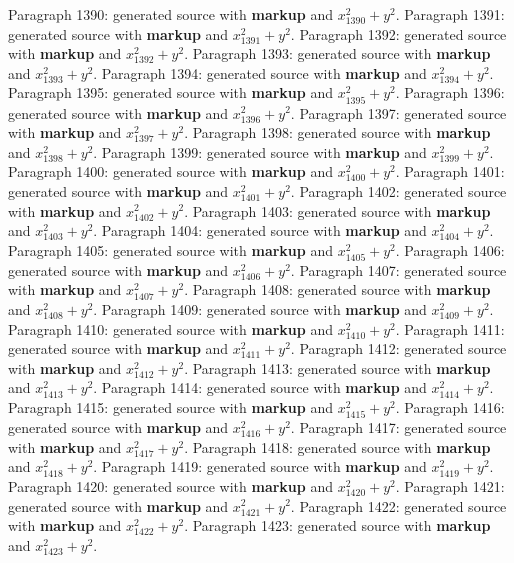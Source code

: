 \documentclass{article}
\begin{document}
Paragraph 1390: generated source with \textbf{markup} and $x_{1390}^2 + y^2$.
Paragraph 1391: generated source with \textbf{markup} and $x_{1391}^2 + y^2$.
Paragraph 1392: generated source with \textbf{markup} and $x_{1392}^2 + y^2$.
Paragraph 1393: generated source with \textbf{markup} and $x_{1393}^2 + y^2$.
Paragraph 1394: generated source with \textbf{markup} and $x_{1394}^2 + y^2$.
Paragraph 1395: generated source with \textbf{markup} and $x_{1395}^2 + y^2$.
Paragraph 1396: generated source with \textbf{markup} and $x_{1396}^2 + y^2$.
Paragraph 1397: generated source with \textbf{markup} and $x_{1397}^2 + y^2$.
Paragraph 1398: generated source with \textbf{markup} and $x_{1398}^2 + y^2$.
Paragraph 1399: generated source with \textbf{markup} and $x_{1399}^2 + y^2$.
Paragraph 1400: generated source with \textbf{markup} and $x_{1400}^2 + y^2$.
Paragraph 1401: generated source with \textbf{markup} and $x_{1401}^2 + y^2$.
Paragraph 1402: generated source with \textbf{markup} and $x_{1402}^2 + y^2$.
Paragraph 1403: generated source with \textbf{markup} and $x_{1403}^2 + y^2$.
Paragraph 1404: generated source with \textbf{markup} and $x_{1404}^2 + y^2$.
Paragraph 1405: generated source with \textbf{markup} and $x_{1405}^2 + y^2$.
Paragraph 1406: generated source with \textbf{markup} and $x_{1406}^2 + y^2$.
Paragraph 1407: generated source with \textbf{markup} and $x_{1407}^2 + y^2$.
Paragraph 1408: generated source with \textbf{markup} and $x_{1408}^2 + y^2$.
Paragraph 1409: generated source with \textbf{markup} and $x_{1409}^2 + y^2$.
Paragraph 1410: generated source with \textbf{markup} and $x_{1410}^2 + y^2$.
Paragraph 1411: generated source with \textbf{markup} and $x_{1411}^2 + y^2$.
Paragraph 1412: generated source with \textbf{markup} and $x_{1412}^2 + y^2$.
Paragraph 1413: generated source with \textbf{markup} and $x_{1413}^2 + y^2$.
Paragraph 1414: generated source with \textbf{markup} and $x_{1414}^2 + y^2$.
Paragraph 1415: generated source with \textbf{markup} and $x_{1415}^2 + y^2$.
Paragraph 1416: generated source with \textbf{markup} and $x_{1416}^2 + y^2$.
Paragraph 1417: generated source with \textbf{markup} and $x_{1417}^2 + y^2$.
Paragraph 1418: generated source with \textbf{markup} and $x_{1418}^2 + y^2$.
Paragraph 1419: generated source with \textbf{markup} and $x_{1419}^2 + y^2$.
Paragraph 1420: generated source with \textbf{markup} and $x_{1420}^2 + y^2$.
Paragraph 1421: generated source with \textbf{markup} and $x_{1421}^2 + y^2$.
Paragraph 1422: generated source with \textbf{markup} and $x_{1422}^2 + y^2$.
Paragraph 1423: generated source with \textbf{markup} and $x_{1423}^2 + y^2$.
\end{document}
